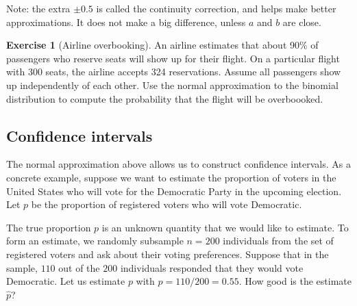 \documentclass[11pt]{article}
\theoremstyle{definition}
\newtheorem{exercise}[]{Exercise}
\begin{document}
Note: the extra $\pm 0.5$ is called the continuity correction, and helps make better approximations.
It does not make a big difference, unless $a$ and $b$ are close.

\begin{exercise}[Airline overbooking]
  An airline estimates that about 90\% of passengers
  who reserve seats will show up for their flight.
   On a particular flight with 300 seats,
   the airline accepts 324 reservations.
   Assume all passengers show up independently of each other. Use the normal approximation to the binomial distribution
   to compute the probability that the flight will be
   overboooked.
\end{exercise}

\subsection{Confidence intervals}

The normal approximation above allows us to
construct confidence intervals. As a concrete example,
suppose we want to estimate the proportion of voters
in the United States
who will vote for the Democratic Party in the
upcoming election.
Let $p$ be the proportion of registered voters
who will vote Democratic.

The true proportion $p$ is an unknown quantity
that we would like to estimate. To form an estimate, we
randomly subsample $n = 200$ individuals
from the set of registered voters and ask
about their voting preferences.
Suppose that in the sample, $110$ out of the $200$
individuals responded that they would vote
Democratic.
Let us estimate $p$ with $\hat p = 110/200 = 0.55$.
How good is the estimate $\hat p$?
\end{document}
